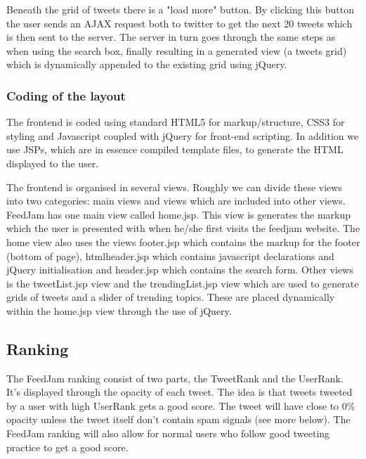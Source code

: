 Beneath the grid of tweets there is a "load more" button. By clicking this button the user sends an AJAX request both to twitter to get the next 20 tweets which is then sent to the server. The server in turn goes through the same steps as when using the search box, finally resulting in a generated view (a tweets grid) which is dynamically appended to the existing grid using jQuery.


\subsubsection{Coding of the layout}
The frontend is coded using standard HTML5 for markup/structure, CSS3 for styling and Javascript coupled with jQuery for front-end scripting. In addition we use JSPs, which are in essence compiled template files, to generate the HTML displayed to the user.

The frontend is organised in several views. Roughly we can divide these views into two categories: main views and views which are included into other views. FeedJam has one main view called home.jsp. This view is generates the markup which the user is presented with when he/she first visits the feedjam website. The home view also uses the views footer.jsp which contains the markup for the footer (bottom of page), htmlheader.jsp which contains javascript declarations and jQuery initialisation and header.jsp which contains the search form. Other views is the tweetList.jsp view and the trendingList.jsp view which are used to generate grids of tweets and a slider of trending topics. These are placed dynamically within the home.jsp view through the use of jQuery.








\subsection{Ranking} %
\label{ranking}
The FeedJam ranking consist of two parts, the TweetRank and the UserRank. It's displayed through the opacity of each tweet. The idea is that tweets tweeted by a user with high UserRank gets a good score. The tweet will have close to 0\% opacity unless the tweet itself don't contain spam signals (see more below). The FeedJam ranking will also allow for normal users who follow good tweeting practice to get a good score.

